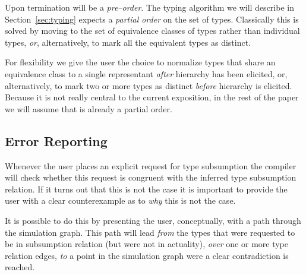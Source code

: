 \documentclass{sigplanconf}
\begin{document}
Upon termination  will be a \emph{pre--order}. The
typing algorithm we will describe in Section~\ref{sec:typing} expects
a \emph{partial order} on the set of types. Classically this is solved
by moving to the set of equivalence classes of types rather than
individual types, \emph{or}, alternatively, to mark all the equivalent
types as distinct.

For flexibility we give the user the choice to normalize types that
share an equivalence class to a single representant \emph{after}
hierarchy has been elicited, or, alternatively, to mark two or more
types as distinct \emph{before} hierarchy is elicited. Because it is
not really central to the current exposition, in the rest of the paper
we will assume that  is already a partial order.

\subsection{Error Reporting}

Whenever the user places an explicit request
for type subsumption the compiler will check whether this request is
congruent with the inferred type subsumption relation. If it turns out
that this is not the case it is important to provide the user with a
clear counterexample as to \emph{why} this is not the case. 

It is possible to do this by presenting the user, conceptually, with a
path through the simulation graph. This path will lead \emph{from} the
types that were requested to be in subsumption relation (but were not
in actuality), \emph{over} one or more type relation edges, \emph{to}
a point in the simulation graph were a clear contradiction is reached.
\end{document}
